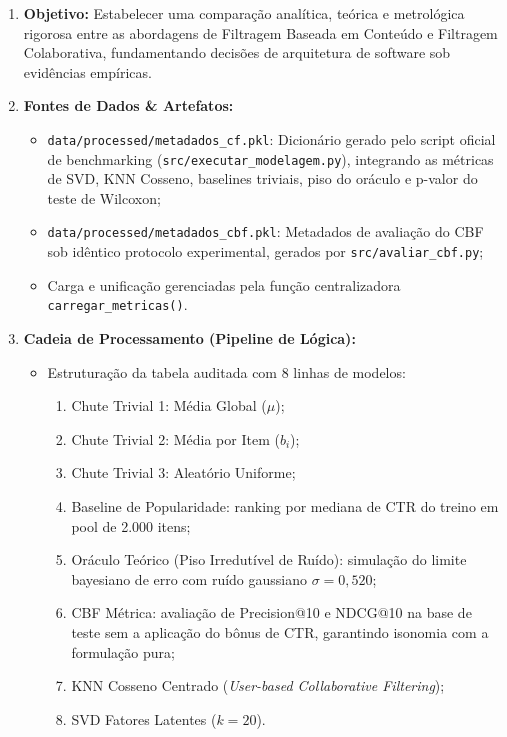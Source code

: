 \begin{enumerate}[label=\textbf{\arabic*.}]
    \item \textbf{Objetivo:} Estabelecer uma comparação analítica, teórica e metrológica rigorosa entre as abordagens de Filtragem Baseada em Conteúdo e Filtragem Colaborativa, fundamentando decisões de arquitetura de software sob evidências empíricas.
    \item \textbf{Fontes de Dados \& Artefatos:}
    \begin{itemize}
        \item \texttt{data/processed/metadados\_cf.pkl}: Dicionário gerado pelo script oficial de benchmarking (\texttt{src/executar\_modelagem.py}), integrando as métricas de SVD, KNN Cosseno, baselines triviais, piso do oráculo e p-valor do teste de Wilcoxon;
        \item \texttt{data/processed/metadados\_cbf.pkl}: Metadados de avaliação do CBF sob idêntico protocolo experimental, gerados por \texttt{src/avaliar\_cbf.py};
        \item Carga e unificação gerenciadas pela função centralizadora \texttt{carregar\_metricas()}.
    \end{itemize}
    \item \textbf{Cadeia de Processamento (Pipeline de Lógica):}
    \begin{itemize}
        \item Estruturação da tabela auditada com 8 linhas de modelos:
        \begin{enumerate}[label=\roman*.]
            \item Chute Trivial 1: Média Global ($\mu$);
            \item Chute Trivial 2: Média por Item ($b_i$);
            \item Chute Trivial 3: Aleatório Uniforme;
            \item Baseline de Popularidade: ranking por mediana de CTR do treino em pool de 2.000 itens;
            \item Oráculo Teórico (Piso Irredutível de Ruído): simulação do limite bayesiano de erro com ruído gaussiano $\sigma = 0{,}520$;
            \item CBF Métrica: avaliação de Precision@10 e NDCG@10 na base de teste sem a aplicação do bônus de CTR, garantindo isonomia com a formulação pura;
            \item KNN Cosseno Centrado (\textit{User-based Collaborative Filtering});
            \item SVD Fatores Latentes ($k=20$).

\end{enumerate}
\end{itemize}
\end{enumerate}
